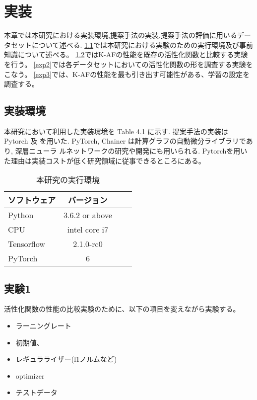 \chapter{実装}
\label{implementation}

本章では本研究における実装環境,提案手法の実装,提案手法の評価に用いるデータセットについて述べる.
\ref{impl_env}では本研究における実験のための実行環境及び事前知識について述べる。
\ref{exp1}ではK-AFの性能を既存の活性化関数と比較する実験を行う。
\ref{exp2}では各データセットにおいての活性化関数の形を調査する実験をこなう。
\ref{exp3}では、K-AFの性能を最も引き出す可能性がある、学習の設定を調査する。



\section{実装環境}
\label{impl_env}



本研究において利用した実装環境を Table 4.1 に示す. 提案手法の実装は Pytorch 及
を用いた.  PyTorch, Chainer は計算グラフの自動微分ライブラリであり, 深層ニューラ
ルネットワークの研究や開発にも用いられる.
Pytorchを用いた理由は実装コストが低く研究領域に従事できるところにある。


\begin{table}[htbp]
    \begin{center}
        \caption{本研究の実行環境}
        \vspace{5mm} 
        \begin{tabular}{l*{2}{c}r}
        ソフトウェア              & バージョン \\
        \hline
        Python            & 3.6.2 or above \\
        CPU               & intel core i7 \\
        Tensorflow        & 2.1.0-rc0 \\
        PyTorch           & 6 \\
        \end{tabular}
    \end{center}
\end{table}



\section{実験1}
\label{exp1}
活性化関数の性能の比較実験のために、以下の項目を変えながら実験する。
\begin{itemize}

    \setlength{\parskip}{0cm} %
    \setlength{\itemsep}{0cm} %
    \item ラーニングレート
    \item 初期値、
    \item レギュラライザー(l1ノルムなど)
    \item optimizer
    \item テストデータ
\end{itemize}

